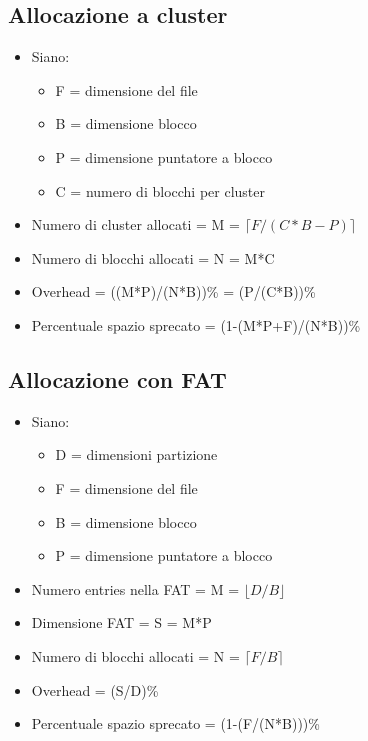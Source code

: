 \documentclass[10pt]{article}
\begin{document}
\subsection*{Allocazione a cluster}
\begin{itemize}
    \item Siano:
    \begin{itemize}
        \item F = dimensione del file
        \item B = dimensione blocco
        \item P = dimensione puntatore a blocco
        \item C = numero di blocchi per cluster
    \end{itemize}
    \item Numero di cluster allocati = M = $\lceil F/(C*B-P) \rceil$
    \item Numero di blocchi allocati = N = M*C
    \item Overhead = ((M*P)/(N*B))\% = (P/(C*B))\%
    \item Percentuale spazio sprecato = (1-(M*P+F)/(N*B))\%
\end{itemize}
\subsection*{Allocazione con FAT}
\begin{itemize}
    \item Siano:
    \begin{itemize}
        \item D = dimensioni partizione
        \item F = dimensione del file
        \item B = dimensione blocco
        \item P = dimensione puntatore a blocco
    \end{itemize}
    \item Numero entries nella FAT = M = $\lfloor D/B \rfloor$
    \item Dimensione FAT = S = M*P
    \item Numero di blocchi allocati = N = $\lceil F/B \rceil$
    \item Overhead = (S/D)\%
    \item Percentuale spazio sprecato = (1-(F/(N*B)))\%
\end{itemize}
\end{document}
